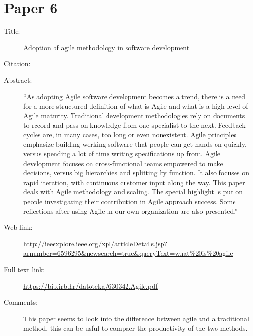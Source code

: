 \documentclass{scrartcl}
\begin{document}
\section*{Paper 6}
\begin{description}
	\item[Title:] Adoption of agile methodology in software development 
	\item[Citation:] \cite{AdoptAgile}
	\item[Abstract:] ``As adopting Agile software development becomes a trend, there is a need for a more structured definition of what is Agile and what is a high-level of Agile maturity. Traditional development methodologies rely on documents to record and pass on knowledge from one specialist to the next. Feedback cycles are, in many cases, too long or even nonexistent. Agile principles emphasize building working software that people can get hands on quickly, versus spending a lot of time writing specifications up front. Agile development focuses on cross-functional teams empowered to make decisions, versus big hierarchies and splitting by function. It also focuses on rapid iteration, with continuous customer input along the way. This paper deals with Agile methodology and scaling. The special highlight is put on people investigating their contribution in Agile approach success. Some reflections after using Agile in our own organization are also presented.''
	\item[Web link:] \url{http://ieeexplore.ieee.org/xpl/articleDetails.jsp?arnumber=6596295&newsearch=true&queryText=what%20is%20agile}
	\item[Full text link:] \url{https://bib.irb.hr/datoteka/630342.Agile.pdf}
	\item[Comments:] This paper seems to look into the difference between agile and a traditional method, this can be usful to compaer the productivity of the two methods.
\end{description}
\end{document}
